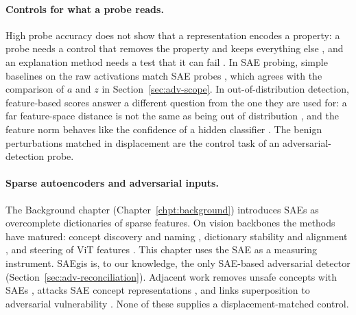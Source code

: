 \documentclass[../ppgc-tese.tex]{subfiles}
\begin{document}
\paragraph*{Controls for what a probe reads.}
High probe accuracy does not show that a representation encodes a property: a
probe needs a control that removes the property and keeps everything else
\cite{hewitt2019control_tasks,belinkov2022probing_classifiers}, and an
explanation method needs a test that it can fail
\cite{adebayo2018sanity_checks_saliency}. In SAE probing, simple baselines on
the raw activations match SAE probes \cite{kantamneni2025sae_probing}, which
agrees with the comparison of $a$ and $z$ in Section~\ref{sec:adv-scope}. In
out-of-distribution detection, feature-based scores answer a different question
from the one they are used for: a far feature-space distance is not the same as
being out of distribution \cite{li2025ood_wrong_questions}, and the feature
norm behaves like the confidence of a hidden classifier
\cite{park2023feature_norm_ood}. The benign perturbations matched in
displacement are the control task of an adversarial-detection probe. %

\paragraph*{Sparse autoencoders and adversarial inputs.}
The Background chapter (Chapter~\ref{chpt:background}) introduces SAEs as
overcomplete dictionaries of sparse features. On vision backbones the methods
have matured: concept discovery and naming
\cite{rao2024discover_then_name,gorton2024curve_detectors_sae,pach2025sae_monosemantic_vlm,lim2025sae_visual_concepts,zaigrajew2025clip_hierarchical_sae,stevens2025testable_vision_sae},
dictionary stability and alignment
\cite{fel2025archetypal_sae,thasarathan2025universal_sae}, and steering of ViT
features \cite{joseph2025steering_clip_sae,han2025causal_sae_vision}. This
chapter uses the SAE as a measuring instrument. SAEgis \cite{wang2026saegis}
is, to our knowledge, the only SAE-based adversarial detector
(Section~\ref{sec:adv-reconciliation}). Adjacent work removes unsafe concepts
with SAEs \cite{geng2025sae_unsafe_concepts}, attacks SAE concept
representations \cite{li2026sae_concept_robustness}, and links superposition to
adversarial vulnerability \cite{bereska2025superposition_lossy}. None of these
supplies a displacement-matched control. %
\end{document}
